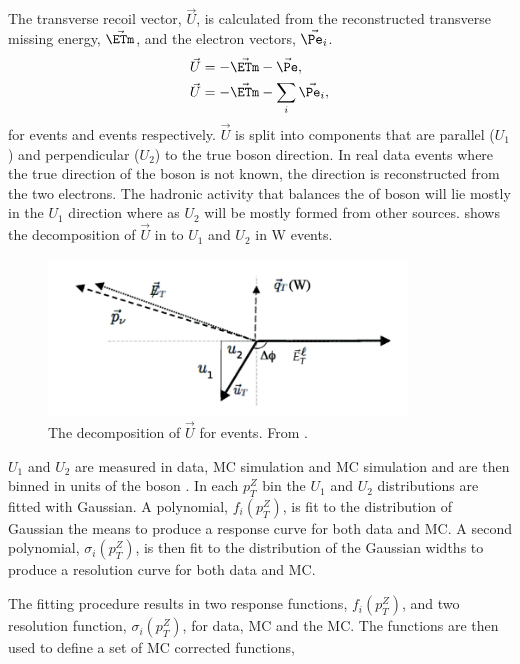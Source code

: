 The transverse recoil vector, $\vec{U}$, is calculated from the reconstructed
transverse missing energy, $\vec{\ETm}$, and the electron \ET vectors,
$\vec{\Pe_{i}}$.
\begin{align}
\vec{U} &= - \vec{\ETm} - \vec{\Pe},\\
\vec{U} &= - \vec{\ETm} - \sum_i \vec{\Pe_{i}},
\end{align}
for \PW events and \PZ events respectively. $\vec{U}$ is split into components
that are parallel ($U_1$) and perpendicular ($U_2$) to the true boson \pT
direction. 
In real \PZ data events where the true direction of the boson \pT is not known,
the \pT direction is reconstructed from the two electrons.
The hadronic activity that balances the \pT of boson will lie mostly in the
$U_1$ direction where as $U_2$ will be mostly formed from other sources.
 shows the decomposition of $\vec{U}$ in to $U_1$ and
$U_2$ in W events.
\begin{figure}
  \begin{center}
    \includegraphics*[width=0.85\textwidth]{recoildiag}
    \caption{The decomposition of $\vec{U}$ for \PW events. From \cite{recoil}.}
    \label{fig:recoil}
  \end{center}
\end{figure}

$U_1$ and $U_2$ are measured in \PZ data, \PZ \ac{MC} simulation and \PW \ac{MC}
simulation and are then binned in units of the boson \pT.  In each $p_T^{Z}$ bin
the $U_1$ and $U_2$ distributions are fitted with Gaussian.  A polynomial,
$f_i(p_T^Z)$, is fit to the distribution of Gaussian the means to produce a
response curve for both data and \ac{MC}.  A second polynomial,
$\sigma_i(p_T^Z)$, is then fit to the distribution of the Gaussian widths to
produce a resolution curve for both data and \ac{MC}.

The fitting procedure results in two response functions, $f_i(p_T^Z)$, and two
resolution function, $\sigma_i(p_T^Z)$, for \PZ data, \PZ \ac{MC} and the \PW
\ac{MC}. The functions are then used to define a set of \PW \ac{MC} corrected
functions, 

